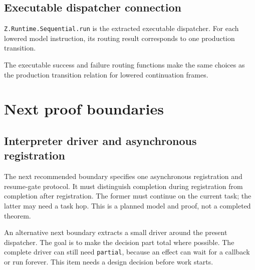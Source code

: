 \section{Executable dispatcher connection}

\begin{theorem}
\label{thm:dispatcher-run}
\leanok
\texttt{Z.Runtime.Sequential.run} is the extracted executable dispatcher.
For each lowered model instruction, its routing result corresponds to one
production transition.
\end{theorem}

\begin{theorem}
\label{thm:dispatcher-resume}
\leanok
The executable success and failure routing functions make the same choices as
the production transition relation for lowered continuation frames.
\end{theorem}

\chapter{Next proof boundaries}

\section{Interpreter driver and asynchronous registration}

\begin{definition}
\label{def:resume-gate}
\notready
The next recommended boundary specifies one asynchronous registration and
resume-gate protocol. It must distinguish completion during registration from
completion after registration. The former must continue on the current task;
the latter may need a task hop. This is a planned model and proof, not a
completed theorem.
\end{definition}

\begin{definition}
\label{def:interpreter-driver}
\notready
An alternative next boundary extracts a small driver around the present
dispatcher. The goal is to make the decision part total where possible. The
complete driver can still need \texttt{partial}, because an effect can wait
for a callback or run forever. This item needs a design decision before work
starts.
\end{definition}

